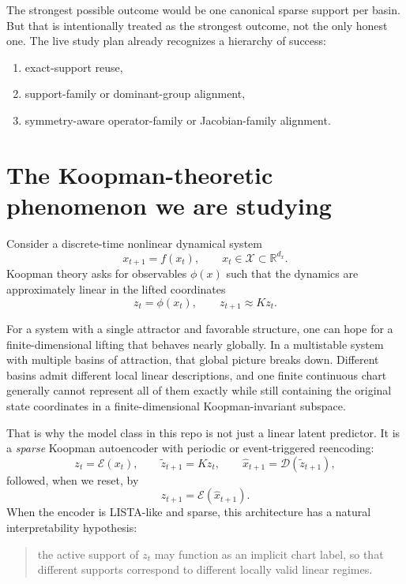 \documentclass[11pt]{article}
\newcommand{\R}{\mathbb{R}}
\newcommand{\Enc}{\mathcal{E}}
\newcommand{\Dec}{\mathcal{D}}
\begin{document}
The strongest possible outcome would be one canonical sparse support per basin.
But that is intentionally treated as the strongest outcome, not the only honest
one. The live study plan already recognizes a hierarchy of success:
\begin{enumerate}[leftmargin=1.5em]
    \item exact-support reuse,
    \item support-family or dominant-group alignment,
    \item symmetry-aware operator-family or Jacobian-family alignment.
\end{enumerate}

\section{The Koopman-theoretic phenomenon we are studying}

Consider a discrete-time nonlinear dynamical system
\begin{equation}
    x_{t+1} = f(x_t), \qquad x_t \in \mathcal{X} \subset \R^{d_x}.
\end{equation}
Koopman theory asks for observables $\phi(x)$ such that the dynamics are
approximately linear in the lifted coordinates
\begin{equation}
    z_t = \phi(x_t), \qquad z_{t+1} \approx K z_t.
\end{equation}

For a system with a single attractor and favorable structure, one can hope for
a finite-dimensional lifting that behaves nearly globally. In a multistable
system with multiple basins of attraction, that global picture breaks down.
Different basins admit different local linear descriptions, and one finite
continuous chart generally cannot represent all of them exactly while still
containing the original state coordinates in a finite-dimensional
Koopman-invariant subspace.

That is why the model class in this repo is not just a linear latent predictor.
It is a \emph{sparse} Koopman autoencoder with periodic or event-triggered
reencoding:
\begin{equation}
    z_t = \Enc(x_t), \qquad \tilde z_{t+1} = K z_t, \qquad \hat x_{t+1} = \Dec(\tilde z_{t+1}),
\end{equation}
followed, when we reset, by
\begin{equation}
    z_{t+1} = \Enc(\hat x_{t+1}).
\end{equation}
When the encoder is LISTA-like and sparse, this architecture has a natural
interpretability hypothesis:
\begin{quote}
the active support of $z_t$ may function as an implicit chart label, so that
different supports correspond to different locally valid linear regimes.
\end{quote}
\end{document}
